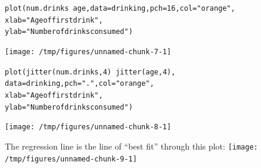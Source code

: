 \documentclass{beamer}\usepackage[]{graphicx}\usepackage[]{color}
\makeatletter
\newcommand{\hlnum}[1]{\textcolor[rgb]{0.824,0.412,0.118}{#1}}%
\newcommand{\hlstr}[1]{\textcolor[rgb]{1,0.894,0.71}{#1}}%
\newcommand{\hlopt}[1]{\textcolor[rgb]{1,0.894,0.769}{#1}}%
\newcommand{\hlstd}[1]{\textcolor[rgb]{1,0.894,0.769}{#1}}%
\newcommand{\hlkwc}[1]{\textcolor[rgb]{0.78,0.941,0.545}{#1}}%
\newcommand{\hlkwd}[1]{\textcolor[rgb]{1,0.78,0.769}{#1}}%
\newenvironment{kframe}{%
 \def\at@end@of@kframe{}%
 \ifinner\ifhmode%
  \def\at@end@of@kframe{\end{minipage}}%
  \begin{minipage}{\columnwidth}%
 \fi\fi%
 \def\FrameCommand##1{\hskip\@totalleftmargin \hskip-\fboxsep
 \colorbox{shadecolor}{##1}\hskip-\fboxsep
     \hskip-\linewidth \hskip-\@totalleftmargin \hskip\columnwidth}%
 \MakeFramed {\advance\hsize-\width
   \@totalleftmargin\z@ \linewidth\hsize
   \@setminipage}}%
 {\par\unskip\endMakeFramed%
 \at@end@of@kframe}
\newenvironment{knitrout}{}{} %
\makeatother
\begin{document}
\begin{darkframes}
\begin{frame}[fragile]
\begin{knitrout}
\end{knitrout}
    \end{frame}


    \begin{frame}[fragile]
\begin{knitrout}
\color{fgcolor}\begin{kframe}
\begin{alltt}
\hlkwd{plot}\hlstd{(num.drinks} \hlopt{~} \hlstd{age,} \hlkwc{data}\hlstd{=drinking,} \hlkwc{pch}\hlstd{=}\hlnum{16}\hlstd{,} \hlkwc{col}\hlstd{=}\hlstr{"orange"}\hlstd{,}
  \hlkwc{xlab}\hlstd{=}\hlstr{"Age of first drink"}\hlstd{,}
  \hlkwc{ylab}\hlstd{=}\hlstr{"Number of drinks consumed"}\hlstd{)}
\end{alltt}
\end{kframe}
\texttt{[image: /tmp/figures/unnamed-chunk-7-1]} 

\end{knitrout}
    \end{frame}

    \begin{frame}[fragile]
\begin{knitrout}
\color{fgcolor}\begin{kframe}
\begin{alltt}
\hlkwd{plot}\hlstd{(}\hlkwd{jitter}\hlstd{(num.drinks,} \hlnum{4}\hlstd{)} \hlopt{~} \hlkwd{jitter}\hlstd{(age,} \hlnum{4}\hlstd{),}
  \hlkwc{data}\hlstd{=drinking,} \hlkwc{pch}\hlstd{=}\hlstr{"."}\hlstd{,} \hlkwc{col}\hlstd{=}\hlstr{"orange"}\hlstd{,}
  \hlkwc{xlab}\hlstd{=}\hlstr{"Age of first drink"}\hlstd{,}
  \hlkwc{ylab}\hlstd{=}\hlstr{"Number of drinks consumed"}\hlstd{)}
\end{alltt}
\end{kframe}
\texttt{[image: /tmp/figures/unnamed-chunk-8-1]} 

\end{knitrout}
    \end{frame}

    \begin{frame}[fragile]
      The regression line is the line of ``best fit'' through this plot:
\begin{knitrout}
\color{fgcolor}
\texttt{[image: /tmp/figures/unnamed-chunk-9-1]} 

\end{knitrout}
      
    \end{frame}


\end{darkframes}
\end{document}
